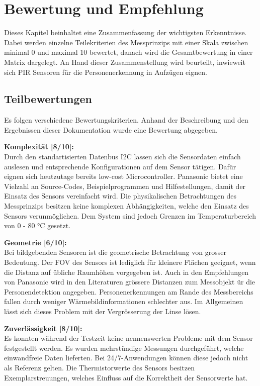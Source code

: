 \chapter{Bewertung und Empfehlung}
\label{Empfehlung_Vorgehen}

Dieses Kapitel beinhaltet eine Zusammenfassung der wichtigsten Erkenntnisse. Dabei werden einzelne Teilekriterien des Messprinzips mit einer Skala zwischen minimal 0 und maximal 10  bewertet, danach wird die Gesamtbewertung in einer Matrix dargelegt. An Hand dieser Zusammenstellung wird beurteilt, inwieweit sich PIR Sensoren für die Personenerkennung in Aufzügen eignen. 

\section{Teilbewertungen}
\label{sec:Teilbewertung}

Es folgen verschiedene Bewertungskriterien. Anhand der Beschreibung und den Ergebnissen dieser Dokumentation wurde eine Bewertung abgegeben.

\textbf{Komplexität [8/10]:} \\
Durch den standartisierten Datenbus \ac{I2C} lassen sich die Sensordaten einfach auslesen und entsprechende Konfigurationen auf dem Sensor tätigen. Dafür eignen sich heutzutage bereits low-cost Microcontroller. Panasonic bietet eine Vielzahl an Source-Codes, Beispielprogrammen und Hilfestellungen, damit der Einsatz des Sensors vereinfacht wird. Die physikalischen Betrachtungen des Messprinzips besitzen keine komplexen Abhängigkeiten, welche den Einsatz des Sensors verunmöglichen. Dem System sind jedoch Grenzen im Temperaturbereich von 0 - 80 °C gesetzt.

\textbf{Geometrie [6/10]:} \\
Bei bildgebenden Sensoren ist die geometrische Betrachtung von grosser Bedeutung. Der \ac{FOV} des Sensors ist lediglich für kleinere Flächen geeignet, wenn die Distanz auf übliche Raumhöhen vorgegeben ist. Auch in den Empfehlungen von Panasonic wird in den Literaturen grössere Distanzen zum Messobjekt ür die Personendetektion angegeben. Personenerkennungen am Rande des Messbereichs fallen durch weniger Wärmebildinformationen schlechter aus. Im Allgemeinen lässt sich dieses Problem mit der Vergrösserung der Linse lösen.

\textbf{Zuverlässigkeit [8/10]:} \\
Es konnten während der Testzeit keine nennenswerten Probleme mit dem Sensor festgestellt werden. Es wurden mehrstündige Messungen durchgeführt, welche einwandfreie Daten lieferten. Bei 24/7-Anwendungen können diese jedoch nicht als Referenz gelten. Die Thermistorwerte des Sensors besitzen Exemplarstreuungen, welches Einfluss auf die Korrektheit der Sensorwerte hat.
  

